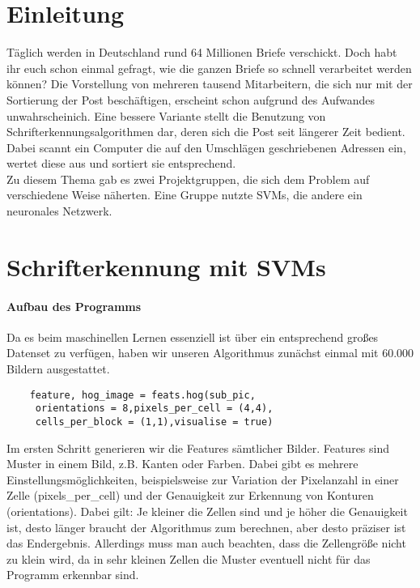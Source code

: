 \section{Einleitung}

Täglich werden in Deutschland rund 64 Millionen Briefe verschickt. Doch habt ihr euch schon einmal gefragt, wie die ganzen Briefe so schnell verarbeitet werden können? Die Vorstellung von mehreren tausend Mitarbeitern, die sich nur mit der Sortierung der Post beschäftigen, erscheint schon aufgrund des Aufwandes unwahrscheinich. Eine bessere Variante stellt die Benutzung von Schrifterkennungsalgorithmen dar, deren sich die Post seit längerer Zeit bedient. Dabei scannt ein Computer die auf den Umschlägen geschriebenen Adressen ein, wertet diese aus und sortiert sie entsprechend. \\
Zu diesem Thema gab es zwei Projektgruppen, die sich dem Problem auf verschiedene Weise näherten. Eine Gruppe nutzte SVMs, die andere ein neuronales Netzwerk.


\section{Schrifterkennung mit SVMs}

\paragraph{Aufbau des Programms}

Da es beim maschinellen Lernen essenziell ist über ein entsprechend großes Datenset zu verfügen, haben wir unseren Algorithmus zunächst einmal mit 60.000 Bildern ausgestattet. 

\begin{verbatim}
	feature, hog_image = feats.hog(sub_pic,
	 orientations = 8,pixels_per_cell = (4,4),
	 cells_per_block = (1,1),visualise = true)
\end{verbatim}

Im ersten Schritt generieren wir die Features sämtlicher Bilder. Features sind Muster in einem Bild, z.B. Kanten oder Farben. Dabei gibt es mehrere Einstellungsmöglichkeiten, beispielsweise zur Variation der Pixelanzahl in einer Zelle (pixels\_per\_cell) und der Genauigkeit zur Erkennung von Konturen (orientations). Dabei gilt: Je kleiner die Zellen sind und je höher die Genauigkeit ist, desto länger braucht der Algorithmus zum berechnen, aber desto präziser ist das Endergebnis. Allerdings muss man auch beachten, dass die Zellengröße nicht zu klein wird, da in sehr kleinen Zellen die Muster eventuell nicht für das Programm erkennbar sind. 

